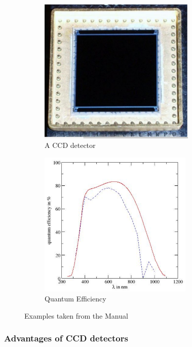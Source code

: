 \begin{figure}[h]
	\begin{subfigure}{0.5\textwidth}
	\centering
	\includegraphics[width=0.9\linewidth ,height=7cm]{report_pictures/CCD.png}
	\caption{A CCD detector}
	\label{CCD}
	\end{subfigure}
	\begin{subfigure}{0.5\textwidth}
	\centering
	\includegraphics[width=0.9\linewidth ,height=7cm]{report_pictures/QE.png}
	\caption{Quantum Efficiency }
	\label{QE}
	\end{subfigure}
	\caption{Examples taken from the Manual \cite{manual}}
	\label{examples}
\end{figure}
\subsubsection{Advantages of CCD detectors}

